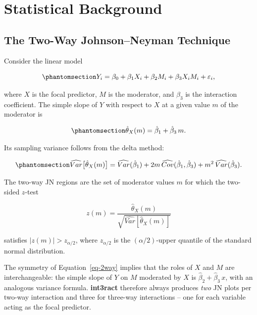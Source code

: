 \documentclass[
  letterpaper,
  DIV=11,
  numbers=noendperiod]{scrartcl}
\begin{document}
\section{Statistical Background}\label{sec-background}

\subsection{The Two-Way Johnson--Neyman
Technique}\label{the-two-way-johnsonneyman-technique}

Consider the linear model

\begin{equation}\phantomsection\label{eq-2way}{
Y_i = \beta_0 + \beta_1 X_i + \beta_2 M_i + \beta_3 X_i M_i + \varepsilon_i,
}\end{equation}

where \(X\) is the focal predictor, \(M\) is the moderator, and
\(\beta_3\) is the interaction coefficient. The simple slope of \(Y\)
with respect to \(X\) at a given value \(m\) of the moderator is

\begin{equation}\phantomsection\label{eq-simpleslope}{
\hat{\theta}_X(m) = \hat{\beta}_1 + \hat{\beta}_3 \, m.
}\end{equation}

Its sampling variance follows from the delta method:

\begin{equation}\phantomsection\label{eq-var2way}{
\widehat{Var}\bigl[\hat{\theta}_X(m)\bigr]
  = \widehat{Var}(\hat{\beta}_1)
    + 2m\,\widehat{Cov}(\hat{\beta}_1, \hat{\beta}_3)
    + m^2\,\widehat{Var}(\hat{\beta}_3).
}\end{equation}

The two-way JN regions are the set of moderator values \(m\) for which
the two-sided \(z\)-test

\[
z(m) = \frac{\hat{\theta}_X(m)}
            {\sqrt{\widehat{Var}[\hat{\theta}_X(m)]}}
\]

satisfies \(|z(m)| > z_{\alpha/2}\), where \(z_{\alpha/2}\) is the
\((\alpha/2)\)-upper quantile of the standard normal distribution.

The symmetry of Equation~\ref{eq-2way} implies that the roles of \(X\)
and \(M\) are interchangeable: the simple slope of \(Y\) on \(M\)
moderated by \(X\) is \(\hat{\beta}_2 + \hat{\beta}_3 \, x\), with an
analogous variance formula. \textbf{int3ract} therefore always produces
\emph{two} JN plots per two-way interaction and three for three-way
interactions -- one for each variable acting as the focal predictor.
\end{document}

